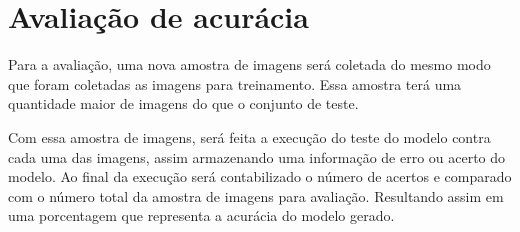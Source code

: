 \section{Avaliação de acurácia}

Para a avaliação, uma nova amostra de imagens será coletada do mesmo
modo que foram coletadas as imagens para treinamento. Essa amostra
terá uma quantidade maior de imagens do que o conjunto de teste.

Com essa amostra de imagens, será feita a execução do teste do modelo
contra cada uma das imagens, assim armazenando uma informação de erro
ou acerto do modelo. Ao final da execução será contabilizado o número
de acertos e comparado com o número total da amostra de imagens para
avaliação. Resultando assim em uma porcentagem que representa a
acurácia do modelo gerado.

